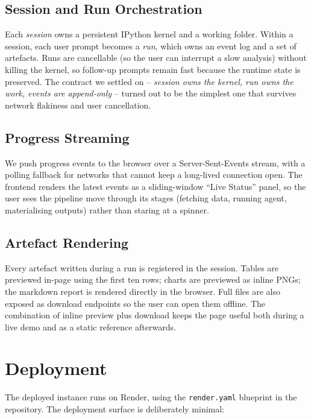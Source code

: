 \documentclass[11pt,a4paper]{article}
\begin{document}
\subsection{Session and Run Orchestration}

Each \emph{session} owns a persistent IPython kernel and a working folder. Within a session, each user prompt becomes a \emph{run}, which owns an event log and a set of artefacts. Runs are cancellable (so the user can interrupt a slow analysis) without killing the kernel, so follow-up prompts remain fast because the runtime state is preserved. The contract we settled on -- \emph{session owns the kernel, run owns the work, events are append-only} -- turned out to be the simplest one that survives network flakiness and user cancellation.

\subsection{Progress Streaming}

We push progress events to the browser over a Server-Sent-Events stream, with a polling fallback for networks that cannot keep a long-lived connection open. The frontend renders the latest events as a sliding-window ``Live Status'' panel, so the user sees the pipeline move through its stages (fetching data, running agent, materialising outputs) rather than staring at a spinner.

\subsection{Artefact Rendering}

Every artefact written during a run is registered in the session. Tables are previewed in-page using the first ten rows; charts are previewed as inline PNGs; the markdown report is rendered directly in the browser. Full files are also exposed as download endpoints so the user can open them offline. The combination of inline preview plus download keeps the page useful both during a live demo and as a static reference afterwards.

\section{Deployment}

The deployed instance runs on Render, using the \texttt{render.yaml} blueprint in the repository. The deployment surface is deliberately minimal:
\end{document}
